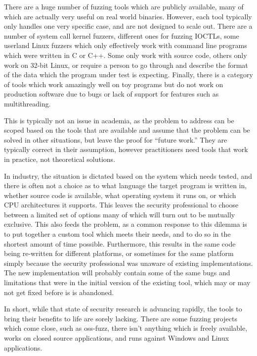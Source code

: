 There are a huge number of fuzzing tools which are publicly available, many of
which are actually very useful on real world binaries.  However, each tool
typically only handles one very specific case, and are not designed to scale
out.  There are a number of system call kernel fuzzers, different ones for
fuzzing IOCTLs, some userland Linux fuzzers which only effectively work with
command line programs which were written in C or C++.  Some only work with
source code, others only work on 32-bit Linux, or require a person to go
through and describe the format of the data which the program under test is
expecting.  Finally, there is a category of tools which work amazingly well
on toy programs but do not work on production software due to bugs or lack of
support for features such as multithreading.

This is typically not an issue in academia, as the problem to address can be
scoped based on the tools that are available and assume that the problem can
be solved in other situations, but leave the proof for ``future work.''  They
are typically correct in their assumption, however practitioners need tools
that work in practice, not theoretical solutions.

In industry, the situation is dictated based on the system which needs tested,
and there is often not a choice as to what language the target program is
written in, whether source code is available, what operating system it runs
on, or which CPU architectures it supports. This leaves the security
professional to choose between a limited set of options many of which will
turn out to be mutually exclusive. This also feeds the problem, as a common
response to this dilemma is to put together a custom tool which meets their
needs, and to do so in the shortest amount of time possible.  Furthermore,
this results in the same code being re-written for different platforms, or
sometimes for the same platform simply because the security professional was
unaware of existing implementations.  The new implementation will probably
contain some of the same bugs and limitations that were in the initial
version of the existing tool, which may or may not get fixed before is is
abandoned.

In short, while that state of security research is advancing rapidly, the
tools to bring their benefits to life are sorely lacking.  There are some
fuzzing projects which come close, such as oss-fuzz,\cite{ossfuzz} there
isn't anything which is freely available, works on closed source applications,
and runs against Windows and Linux applications.
